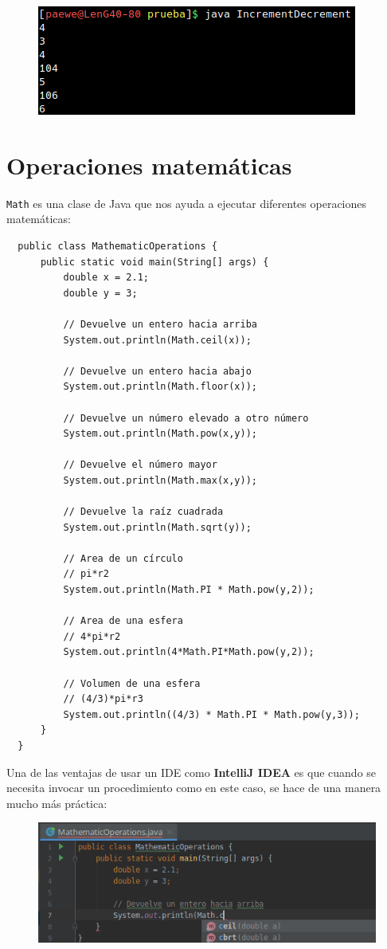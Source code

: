 \documentclass{article}
\begin{document}
\begin{figure}[h!]
  \centering
  \includegraphics[scale=0.75]{./Pictures/040_Increment_Decrement.png}
\end{figure}


\section{Operaciones matemáticas}%
\texttt{Math} es una clase de Java que nos ayuda a ejecutar diferentes
operaciones matemáticas:

\begin{verbatim}
  public class MathematicOperations {
      public static void main(String[] args) {
          double x = 2.1;
          double y = 3;

          // Devuelve un entero hacia arriba
          System.out.println(Math.ceil(x));

          // Devuelve un entero hacia abajo
          System.out.println(Math.floor(x));

          // Devuelve un número elevado a otro número
          System.out.println(Math.pow(x,y));

          // Devuelve el número mayor
          System.out.println(Math.max(x,y));

          // Devuelve la raíz cuadrada
          System.out.println(Math.sqrt(y));

          // Area de un círculo
          // pi*r2
          System.out.println(Math.PI * Math.pow(y,2));

          // Area de una esfera
          // 4*pi*r2
          System.out.println(4*Math.PI*Math.pow(y,2));

          // Volumen de una esfera
          // (4/3)*pi*r3
          System.out.println((4/3) * Math.PI * Math.pow(y,3));
      }
  }
\end{verbatim}

Una de las ventajas de usar un IDE como \textbf{IntelliJ IDEA} es que cuando se
necesita invocar un procedimiento como en este caso, se hace de una manera
mucho más práctica:

\begin{figure}[h!]
  \centering
  \includegraphics[scale=0.75]{./Pictures/041_MathematicOperations.png}
\end{figure}
\end{document}
